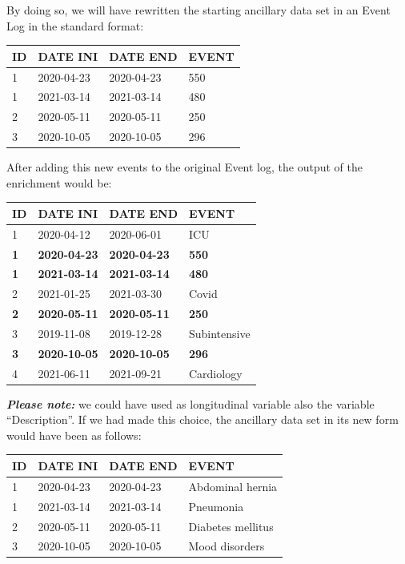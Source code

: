 \documentclass[
]{book}
\begin{document}
By doing so, we will have rewritten the starting ancillary data set in an Event Log in the standard format:

\begin{longtable}[]{@{}llll@{}}
\toprule
ID & DATE INI & DATE END & EVENT \\
\midrule
\endhead
1 & 2020-04-23 & 2020-04-23 & 550 \\
1 & 2021-03-14 & 2021-03-14 & 480 \\
2 & 2020-05-11 & 2020-05-11 & 250 \\
3 & 2020-10-05 & 2020-10-05 & 296 \\
\bottomrule
\end{longtable}

After adding this new events to the original Event log, the output of the enrichment would be:

\begin{longtable}[]{@{}llll@{}}
\toprule
ID & DATE INI & DATE END & EVENT \\
\midrule
\endhead
1 & 2020-04-12 & 2020-06-01 & ICU \\
\textbf{1} & \textbf{2020-04-23} & \textbf{2020-04-23} & \textbf{550} \\
\textbf{1} & \textbf{2021-03-14} & \textbf{2021-03-14} & \textbf{480 } \\
2 & 2021-01-25 & 2021-03-30 & Covid \\
\textbf{2} & \textbf{2020-05-11} & \textbf{2020-05-11} & \textbf{250} \\
3 & 2019-11-08 & 2019-12-28 & Subintensive \\
\textbf{3} & \textbf{2020-10-05} & \textbf{2020-10-05} & \textbf{296} \\
4 & 2021-06-11 & 2021-09-21 & Cardiology \\
\bottomrule
\end{longtable}

\textbf{\emph{Please note:}} we could have used as longitudinal variable also the variable ``Description''. If we had made this choice, the ancillary data set in its new form would have been as follows:

\begin{longtable}[]{@{}llll@{}}
\toprule
ID & DATE INI & DATE END & EVENT \\
\midrule
\endhead
1 & 2020-04-23 & 2020-04-23 & Abdominal hernia \\
1 & 2021-03-14 & 2021-03-14 & Pneumonia \\
2 & 2020-05-11 & 2020-05-11 & Diabetes mellitus \\
3 & 2020-10-05 & 2020-10-05 & Mood disorders \\
\bottomrule
\end{longtable}
\end{document}
